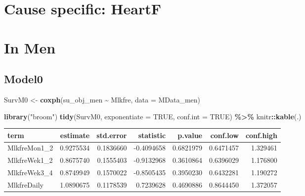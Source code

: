 \documentclass[
]{article}
\newenvironment{Shaded}{\begin{snugshade}}{\end{snugshade}}
\newcommand{\CommentTok}[1]{\textcolor[rgb]{0.56,0.35,0.01}{\textit{#1}}}
\newcommand{\DataTypeTok}[1]{\textcolor[rgb]{0.13,0.29,0.53}{#1}}
\newcommand{\KeywordTok}[1]{\textcolor[rgb]{0.13,0.29,0.53}{\textbf{#1}}}
\newcommand{\NormalTok}[1]{#1}
\newcommand{\OperatorTok}[1]{\textcolor[rgb]{0.81,0.36,0.00}{\textbf{#1}}}
\newcommand{\OtherTok}[1]{\textcolor[rgb]{0.56,0.35,0.01}{#1}}
\newcommand{\StringTok}[1]{\textcolor[rgb]{0.31,0.60,0.02}{#1}}
\begin{document}
\hypertarget{cause-specific-heartf}{%
\section{Cause specific: HeartF}\label{cause-specific-heartf}}

\begin{Shaded}
\end{Shaded}

\hypertarget{in-men-4}{%
\section{In Men}\label{in-men-4}}

\hypertarget{model0-9}{%
\subsection{Model0}\label{model0-9}}

\begin{Shaded}
\begin{Highlighting}[]
\NormalTok{SurvM0 \textless{}{-}}\StringTok{  }\KeywordTok{coxph}\NormalTok{(su\_obj\_men }\OperatorTok{\textasciitilde{}}\StringTok{ }\NormalTok{Mlkfre, }
                 \DataTypeTok{data =}\NormalTok{ MData\_men)}

\KeywordTok{library}\NormalTok{(}\StringTok{"broom"}\NormalTok{)}
\KeywordTok{tidy}\NormalTok{(SurvM0, }\DataTypeTok{exponentiate =} \OtherTok{TRUE}\NormalTok{, }\DataTypeTok{conf.int =} \OtherTok{TRUE}\NormalTok{) }\OperatorTok{\%\textgreater{}\%}\StringTok{ }
\StringTok{  }\NormalTok{knitr}\OperatorTok{::}\KeywordTok{kable}\NormalTok{(.)}
\end{Highlighting}
\end{Shaded}

\begin{longtable}[]{@{}lrrrrrr@{}}
\toprule
term & estimate & std.error & statistic & p.value & conf.low &
conf.high\tabularnewline
\midrule
\endhead
MlkfreMon1\_2 & 0.9275534 & 0.1836660 & -0.4094658 & 0.6821979 &
0.6471457 & 1.329461\tabularnewline
MlkfreWek1\_2 & 0.8675740 & 0.1555403 & -0.9132968 & 0.3610864 &
0.6396029 & 1.176800\tabularnewline
MlkfreWek3\_4 & 0.8749949 & 0.1570022 & -0.8505435 & 0.3950230 &
0.6432281 & 1.190272\tabularnewline
MlkfreDaily & 1.0890675 & 0.1178539 & 0.7239628 & 0.4690886 & 0.8644450
& 1.372057\tabularnewline
\bottomrule
\end{longtable}
\end{document}
